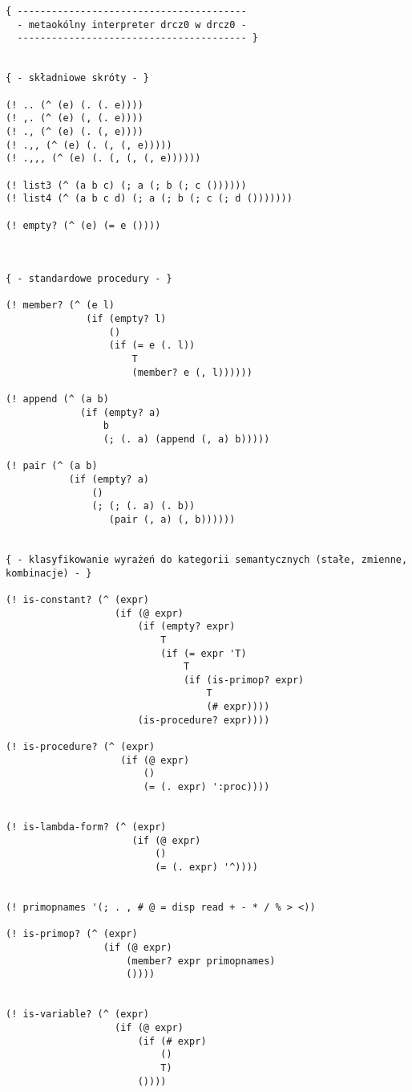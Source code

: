 \documentclass[a4paper]{article}
\begin{document}
\small
\begin{verbatim}
{ ----------------------------------------
  - metaokólny interpreter drcz0 w drcz0 -
  ---------------------------------------- }


{ - składniowe skróty - }

(! .. (^ (e) (. (. e))))
(! ,. (^ (e) (, (. e))))
(! ., (^ (e) (. (, e))))
(! .,, (^ (e) (. (, (, e)))))
(! .,,, (^ (e) (. (, (, (, e))))))

(! list3 (^ (a b c) (; a (; b (; c ())))))
(! list4 (^ (a b c d) (; a (; b (; c (; d ()))))))

(! empty? (^ (e) (= e ())))



{ - standardowe procedury - }

(! member? (^ (e l)
              (if (empty? l)
                  ()
                  (if (= e (. l))
                      T
                      (member? e (, l))))))

(! append (^ (a b)
             (if (empty? a)
                 b
                 (; (. a) (append (, a) b)))))

(! pair (^ (a b)
           (if (empty? a)
               ()
               (; (; (. a) (. b))
                  (pair (, a) (, b))))))


{ - klasyfikowanie wyrażeń do kategorii semantycznych (stałe, zmienne, kombinacje) - }

(! is-constant? (^ (expr)
                   (if (@ expr)
                       (if (empty? expr)
                           T
                           (if (= expr 'T)
                               T
                               (if (is-primop? expr)
                                   T
                                   (# expr))))
                       (is-procedure? expr))))

(! is-procedure? (^ (expr)
                    (if (@ expr)
                        ()
                        (= (. expr) ':proc))))


(! is-lambda-form? (^ (expr)
                      (if (@ expr)
                          ()
                          (= (. expr) '^))))


(! primopnames '(; . , # @ = disp read + - * / % > <))

(! is-primop? (^ (expr)
                 (if (@ expr)                
                     (member? expr primopnames)
                     ())))


(! is-variable? (^ (expr)
                   (if (@ expr)
                       (if (# expr)
                           ()
                           T)
                       ())))


\end{verbatim}
\end{document}
